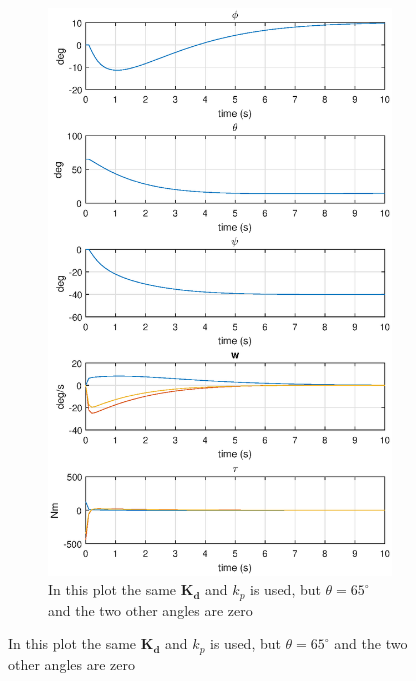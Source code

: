 \begin{figure}[ht]
\begin{subfigure}[b]{0.40\textwidth}
	\end{subfigure}
	~ %
	\begin{subfigure}[b]{0.40\textwidth}
		\includegraphics[width=\textwidth]{1000quat65}
		\caption{In this plot the same $\boldsymbol{K_d}$ and $k_p$ is used, but $\theta=65^\circ$ and the two other angles are zero}
		\label{fig:2b}
	\end{subfigure}
\end{figure}